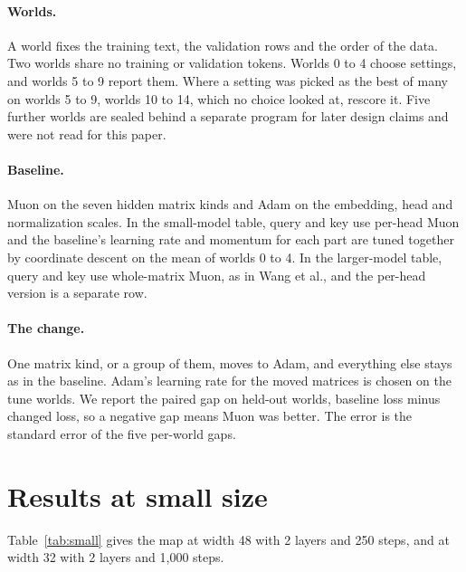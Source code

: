 \documentclass[11pt]{article}
\begin{document}
\paragraph{Worlds.} A world fixes the training text, the validation rows and the order of the data. Two worlds share no training or validation tokens. Worlds 0 to 4 choose settings, and worlds 5 to 9 report them. Where a setting was picked as the best of many on worlds 5 to 9, worlds 10 to 14, which no choice looked at, rescore it. Five further worlds are sealed behind a separate program for later design claims and were not read for this paper.

\paragraph{Baseline.} Muon on the seven hidden matrix kinds and Adam on the embedding, head and normalization scales. In the small-model table, query and key use per-head Muon and the baseline's learning rate and momentum for each part are tuned together by coordinate descent on the mean of worlds 0 to 4. In the larger-model table, query and key use whole-matrix Muon, as in Wang et al., and the per-head version is a separate row.

\paragraph{The change.} One matrix kind, or a group of them, moves to Adam, and everything else stays as in the baseline. Adam's learning rate for the moved matrices is chosen on the tune worlds. We report the paired gap on held-out worlds, baseline loss minus changed loss, so a negative gap means Muon was better. The error is the standard error of the five per-world gaps.

\section{Results at small size}

Table~\ref{tab:small} gives the map at width 48 with 2 layers and 250 steps, and at width 32 with 2 layers and 1,000 steps.
\end{document}
